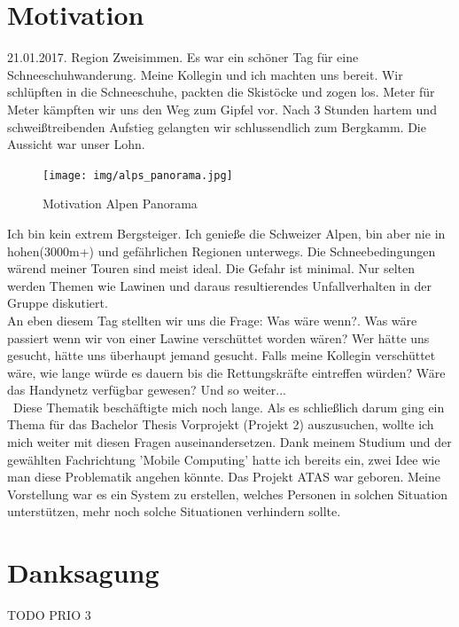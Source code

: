 \documentclass[11pt,english,german]{report}
\theoremstyle{definition}
\begin{document}
\chapter*{Motivation}
21.01.2017. Region Zweisimmen. Es war ein schöner Tag für eine Schneeschuhwanderung. Meine Kollegin und ich machten uns bereit. Wir schlüpften in die Schneeschuhe, packten die Skistöcke und zogen los. Meter für Meter kämpften wir uns den Weg zum Gipfel vor. Nach 3 Stunden hartem und schweißtreibenden Aufstieg gelangten wir schlussendlich zum Bergkamm. Die Aussicht war unser Lohn.
\begin{figure}[H]
	\centering
	\texttt{[image: img/alps\_panorama.jpg]}
	\caption[Motvation Alpen Panorama]
	{Motivation Alpen Panorama}
\end{figure}
\noindent
Ich bin kein extrem Bergsteiger. Ich genieße die Schweizer Alpen, bin aber nie in hohen(3000m+) und gefährlichen Regionen unterwegs. Die Schneebedingungen wärend meiner Touren sind meist ideal. Die Gefahr ist minimal. Nur selten werden Themen wie Lawinen und daraus resultierendes Unfallverhalten in der Gruppe diskutiert.\\[0.3cm]
An eben diesem Tag stellten wir uns die Frage: Was wäre wenn?. Was wäre passiert wenn wir von einer Lawine verschüttet worden wären? Wer hätte uns gesucht, hätte uns überhaupt jemand gesucht. Falls meine Kollegin verschüttet wäre, wie lange würde es dauern bis die Rettungskräfte eintreffen würden? Wäre das Handynetz verfügbar gewesen? Und so weiter...\\[0.3cm]\
Diese Thematik beschäftigte mich noch lange. Als es schließlich darum ging ein Thema für das Bachelor Thesis Vorprojekt (Projekt 2) auszusuchen, wollte ich mich weiter mit diesen Fragen auseinandersetzen. Dank meinem Studium und der gewählten Fachrichtung 'Mobile Computing' hatte ich bereits ein, zwei Idee wie man diese Problematik angehen könnte. Das Projekt ATAS war geboren. Meine Vorstellung war es ein System zu erstellen, welches Personen in solchen Situation unterstützen, mehr noch solche Situationen verhindern sollte.\\[0.3cm]

\chapter*{Danksagung}
TODO
PRIO 3
\end{document}
